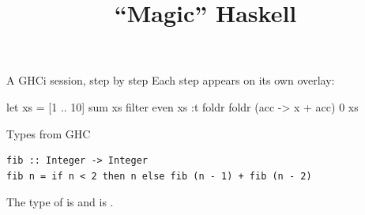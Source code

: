 \documentclass{beamer}
\title{\enquote{Magic} Haskell}
\begin{document}
\begin{frame}[fragile]{A GHCi session, step by step}
Each step appears on its own overlay:
\begin{ghcisession}
let xs = [1 .. 10]
sum xs
filter even xs
:t foldr
foldr (\x acc -> x + acc) 0 xs
\end{ghcisession}
\end{frame}
\begin{frame}[fragile]{Types from GHC}
\begin{verbatim}
fib :: Integer -> Integer
fib n = if n < 2 then n else fib (n - 1) + fib (n - 2)
\end{verbatim}
The type of  is  and  is .
\end{frame}
\end{document}
